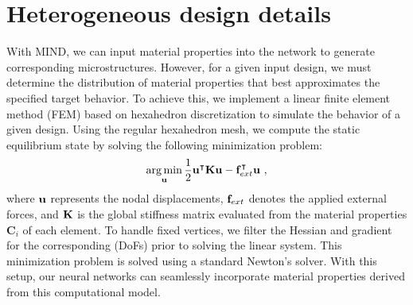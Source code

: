 \section{Heterogeneous design details}
\label{sec:heterogeneous}
With MIND, we can input material properties into the network to generate corresponding microstructures.
However, for a given input design, we must determine the distribution of material properties that best approximates the specified target behavior. 
To achieve this, we implement a linear finite element method (FEM) based on hexahedron discretization to simulate the behavior of a given design. Using the regular hexahedron mesh, we compute the static equilibrium state by solving the following minimization problem:
\begin{equation}
    \operatorname*{arg\,min}_{\mathbf{u}} \frac{1}{2}\mathbf{u}^\intercal \mathbf{K} \mathbf{u} - \mathbf{f}_{ext}^\intercal \mathbf{u} \ ,
\end{equation}
where $\mathbf{u}$ represents the nodal displacements, $\mathbf{f}_{ext}$ denotes the applied external forces, and $\mathbf{K}$ is the global stiffness matrix evaluated from the material properties $\mathbf{C}_i$ of each element. 
To handle fixed vertices, we filter the Hessian and gradient for the corresponding (DoFs) prior to solving the linear system. This minimization problem is solved using a standard Newton's solver. With this setup, our neural networks can seamlessly incorporate material properties derived from this computational model.

